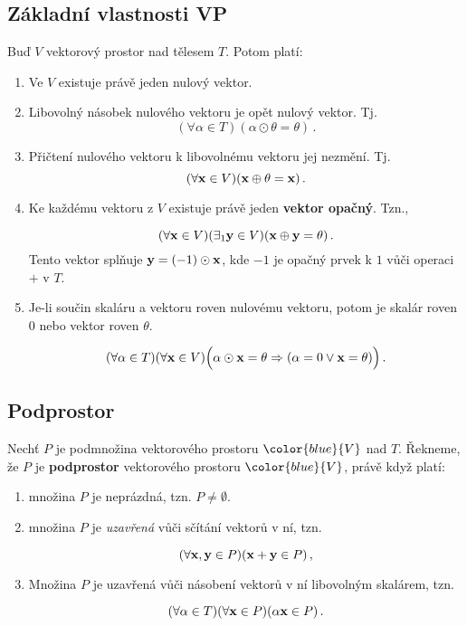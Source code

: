 \subsection*{Základní vlastnosti VP}

Buď $V$ vektorový prostor nad tělesem $T$. Potom platí:

\begin{enumerate}
      \item Ve $V$ existuje právě jeden nulový vektor.
      \item Libovolný násobek nulového vektoru je opět nulový vektor. Tj.
            \[ (\forall \alpha\in T) (\alpha\odot\theta=\theta)\,. \]
      \item Přičtení nulového vektoru k libovolnému vektoru jej nezmění. Tj.
            \[ (\forall \mathbf{x}\in V) (\mathbf{x} \oplus \theta=\mathbf{x})\,. \]

      \item Ke každému vektoru z $V$ existuje právě jeden \textbf{vektor opačný}. Tzn.,

            \[ (\forall \mathbf{x}\in V)(\exists_{1} \mathbf{y}\in V)( \mathbf{x}\oplus\mathbf{y}=\theta)\,. \]
            Tento vektor splňuje $\mathbf{y}= (-1)\odot \mathbf{x}$, kde $-1$ je opačný prvek k $1$ vůči
            operaci $+$ v $T$.
      \item Je-li součin skaláru a vektoru roven nulovému vektoru, potom je skalár roven
            $0$ nebo vektor roven $\theta$.

            \[ (\forall \alpha \in T) (\forall \mathbf{x} \in V)  \Big(\alpha\odot  \mathbf{x}=\theta \Rightarrow (\alpha=0 \vee \mathbf{x}=\theta)\Big)\,. \]
\end{enumerate}

\subsection*{Podprostor}

Nechť $P$ je podmnožina vektorového prostoru $\color{blue}{V}$ nad $T$.
Řekneme, že $P$ je \textbf{podprostor} vektorového prostoru $\color{blue}{V}$,
právě když platí:

\begin{enumerate}
      \item množina $P$ je neprázdná, tzn. $P\neq \emptyset.$
      \item množina $P$ je \emph{uzavřená} vůči sčítání vektorů v ní, tzn.

            \[ (\forall \mathbf{x},\mathbf{y}\in P)(\mathbf{x}+\mathbf{y}\in P)\,, \]

      \item Množina $P$ je uzavřená vůči násobení vektorů v ní libovolným skalárem, tzn.

            \[ (\forall\alpha\in T)(\forall \mathbf{x}\in P) (\alpha \mathbf{x}\in P)\,. \]

\end{enumerate}

